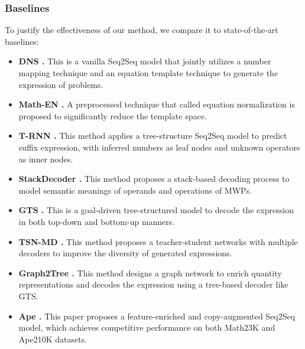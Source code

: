 \documentclass[11pt, a4paper]{article}
\begin{document}
\subsubsection{Baselines}
To justify the effectiveness of our method, we compare it to state-of-the-art baselines:
\begin{itemize}
	\item \textbf{DNS \citep{wang2017deep}.} This is a vanilla Seq2Seq model that jointly utilizes a number mapping technique and an equation template technique to generate the expression of problems.
	\item \textbf{Math-EN \citep{wang2018translating}.} A preprocessed technique that called equation normalization is proposed to significantly reduce the template space. 
	\item \textbf{T-RNN \citep{wang2019template}.} This method applies a tree-structure Seq2Seq model to predict suffix expression, with inferred numbers as leaf nodes and unknown operators as inner nodes.
	\item \textbf{StackDecoder \citep{chiang2019semantically}.} This method proposes a stack-based decoding process to model semantic meanings of operands and operations of MWPs.
	\item \textbf{GTS \citep{xie2019goal}.} This is a goal-driven tree-structured model to decode the expression in both top-down and bottom-up manners.
	\item \textbf{TSN-MD \citep{2020Teacher}.} This method proposes a teacher-student networks with multiple decoders to improve the diversity of generated expressions.
	\item \textbf{Graph2Tree \citep{zhang2020graph}.} This method designs a graph network to enrich quantity representations and decodes the expression using a tree-based decoder like GTS.
	\item \textbf{Ape \citep{zhao2020ape210k}.} This paper proposes a feature-enriched and copy-augmented Seq2Seq model, which achieves competitive performance on both Math23K and Ape210K datasets. 
\end{itemize}
\end{document}
